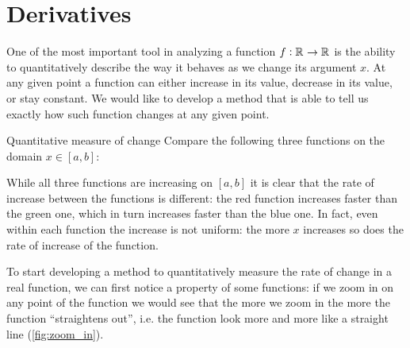 \section{Derivatives}
One of the most important tool in analyzing a function $f:\mathbb{R}^{}\to\mathbb{R}^{}$ is the ability to quantitatively describe the way it behaves as we change its argument $x$. At any given point a function can either increase in its value, decrease in its value, or stay constant. We would like to develop a method that is able to tell us exactly how such function changes at any given point.

\begin{example}{Quantitative measure of change}{}
  Compare the following three functions on the domain $x\in[a,b]$:

  \centering

  \flushleft
  While all three functions are increasing on $[a,b]$ it is clear that the rate of increase between the functions is different: the red function increases faster than the green one, which in turn increases faster than the blue one. In fact, even within each function the increase is not uniform: the more $x$ increases so does the rate of increase of the function.
\end{example}

To start developing a method to quantitatively measure the rate of change in a real function, we can first notice a property of some functions: if we zoom in on any point of the function we would see that the more we zoom in the more the function ``straightens out'', i.e. the function look more and more like a straight line (\autoref{fig:zoom_in}).

